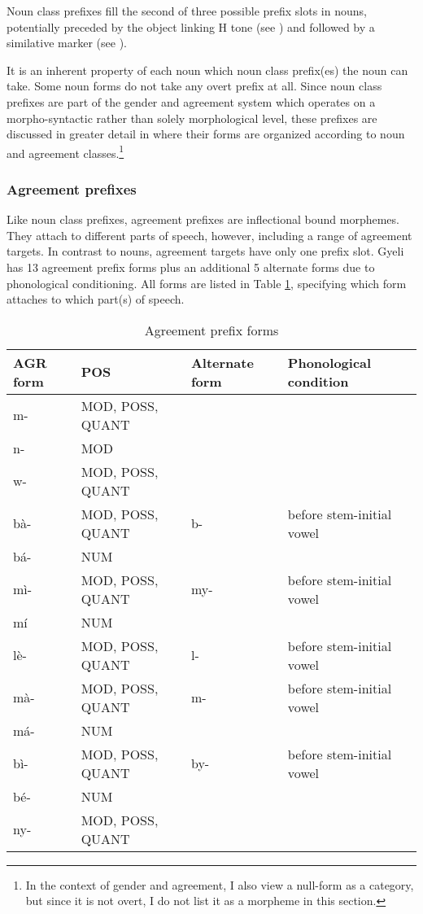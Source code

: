 \noindent  Noun class prefixes fill the second of three possible prefix slots in nouns, potentially preceded by the object linking H tone (see ) and followed by a similative marker (see ). 

It is an inherent property of each noun which noun class prefix(es) the noun can take. Some noun forms do not take any overt prefix at all. Since noun class prefixes are part of the gender and agreement system which operates on a morpho-syntactic rather than solely morphological level,  these prefixes  are discussed in greater detail in  where their forms are organized according to noun and agreement classes.\footnote{In the context of gender and agreement, I also view a null-form as a category, but since it is not overt, I do not list it as a morpheme in this section.}




\subsubsection{Agreement prefixes}
\label{sec:AGRPre}

Like noun class prefixes, agreement prefixes are inflectional bound morphemes. They attach to  different parts of speech, however, including a range of agreement targets. In contrast to nouns, agreement targets have only one prefix slot. Gyeli has 13 agreement prefix forms plus an additional 5 alternate forms due to phonological conditioning. All forms are listed in Table \ref{Tab:AGRmorph}, specifying which form attaches to which part(s) of speech. 

\begin{table}[!h]
\centering
\small
\begin{tabular}{ll|ll}
 \midrule 
AGR form & POS & Alternate form  & Phonological condition \\
 \midrule
m- & MOD, POSS, QUANT &   &   \\
n- &  MOD &     &     \\
w- & MOD, POSS, QUANT &     &     \\
bà- & MOD, POSS, QUANT &  b- & before stem-initial vowel \\ 
bá- & NUM &     &  					\\
mì- & MOD, POSS, QUANT & my- & before stem-initial vowel \\
mí  & NUM &        & 					\\
lè- & MOD, POSS, QUANT &  l- &  before stem-initial vowel \\
mà- & MOD, POSS, QUANT &  m- & before stem-initial vowel \\
má- &  NUM &     & 					\\
bì-  & MOD, POSS, QUANT &  by- & 	before stem-initial vowel	\\
bé- & NUM &  & 						\\
ny-  & MOD, POSS, QUANT &   & 					\\
 \midrule
\end{tabular}
\caption{Agreement prefix forms}
\label{Tab:AGRmorph}
\end{table} 

